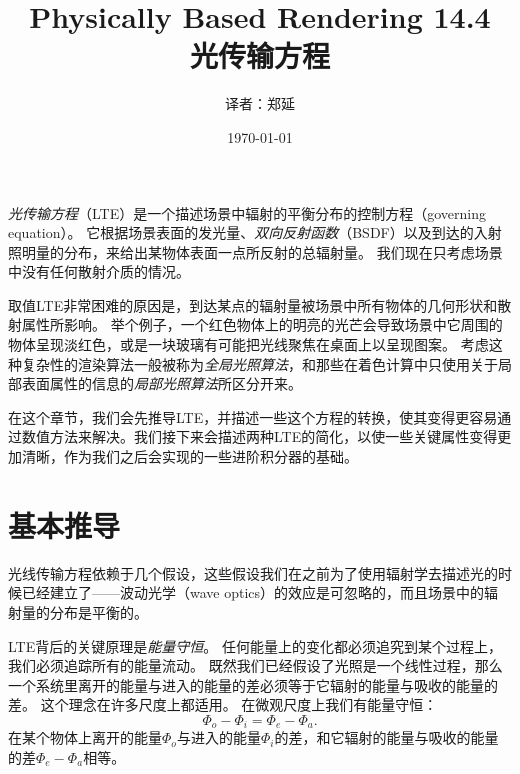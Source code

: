 \documentclass[a4paper]{article}
\title{Physically Based Rendering 14.4\\
光传输方程}
\date{\today}
\author{译者：郑延}
\begin{document}
	\maketitle
	\newpage
	\textit{光传输方程}（LTE）是一个描述场景中辐射的平衡分布的控制方程（governing equation）。
	它根据场景表面的发光量、\textit{双向反射函数}（BSDF）以及到达的入射照明量的分布，来给出某物体表面一点所反射的总辐射量。
	我们现在只考虑场景中没有任何散射介质的情况。

	取值LTE非常困难的原因是，到达某点的辐射量被场景中所有物体的几何形状和散射属性所影响。
	举个例子，一个红色物体上的明亮的光芒会导致场景中它周围的物体呈现淡红色，或是一块玻璃有可能把光线聚焦在桌面上以呈现图案。
	考虑这种复杂性的渲染算法一般被称为\textit{全局光照算法}，和那些在着色计算中只使用关于局部表面属性的信息的\textit{局部光照算法}所区分开来。

	在这个章节，我们会先推导LTE，并描述一些这个方程的转换，使其变得更容易通过数值方法来解决。我们接下来会描述两种LTE的简化，以使一些关键属性变得更加清晰，作为我们之后会实现的一些进阶积分器的基础。

	\section{基本推导}
	光线传输方程依赖于几个假设，这些假设我们在之前为了使用辐射学去描述光的时候已经建立了——波动光学（wave optics）的效应是可忽略的，而且场景中的辐射量的分布是平衡的。

	LTE背后的关键原理是\textit{能量守恒}。
	任何能量上的变化都必须追究到某个过程上，我们必须追踪所有的能量流动。
	既然我们已经假设了光照是一个线性过程，那么一个系统里离开的能量与进入的能量的差必须等于它辐射的能量与吸收的能量的差。
	这个理念在许多尺度上都适用。
	在微观尺度上我们有能量守恒：
	\begin{equation*}
		\Phi_o - \Phi_i = \Phi_e - \Phi_a.
	\end{equation*}
	在某个物体上离开的能量$\Phi_{o}$与进入的能量$\Phi_i$的差，和它辐射的能量与吸收的能量的差$\Phi_e - \Phi_a$相等。
\end{document}
